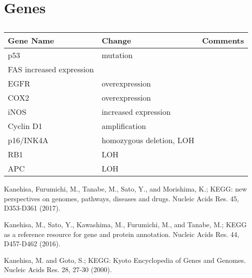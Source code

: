 

\section{Genes}

\begin{table}[H]\centering
  \caption {\cite{key400}}
	\begin{tabular}{p{1cm}p{4cm}p{3cm}}
		Gene Name & Change & Comments\\
		\hline
    p53  & mutation & \\
    FAS increased expression & \\
    EGFR & overexpression & \\
    COX2 & overexpression &  \\
    iNOS & increased expression & \\
    Cyclin D1 & amplification & \\
    p16/INK4A & homozygous deletion, LOH & \\
    RB1  & LOH & \\
    APC  & LOH & \\
		\hline
	\end{tabular}
\end{table}





 Kanehisa, Furumichi, M., Tanabe, M., Sato, Y., and Morishima, K.; 
\newblock KEGG: new perspectives on genomes, pathways, diseases and drugs. 
\newblock Nucleic Acids Res. 45, D353-D361 (2017).

 Kanehisa, M., Sato, Y., Kawashima, M., Furumichi, M., and Tanabe, M.; 
\newblock KEGG as a reference resource for gene and protein annotation. 
\newblock Nucleic Acids Res. 44, D457-D462 (2016).

 Kanehisa, M. and Goto, S.; 
\newblock KEGG: Kyoto Encyclopedia of Genes and Genomes. 
\newblock Nucleic Acids Res. 28, 27-30 (2000). 
